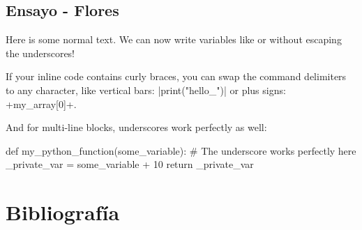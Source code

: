 \documentclass[11pt,letterpaper,spanish]{article}
\newcommand{\integranteCuatro}{Flores}
\begin{document}
\subsection*{Ensayo - \integranteCuatro}





Here is some normal text. We can now write variables like  or  without escaping the underscores!

If your inline code contains curly braces, you can swap the command delimiters to any character, like vertical bars: \code|print("hello_{}")| or plus signs: \code+my_array[0]+.

And for multi-line blocks, underscores work perfectly as well:

\begin{codeblock}
	def my_python_function(some_variable):
	# The underscore works perfectly here
	_private_var = some_variable + 10
	return _private_var
\end{codeblock}


\section*{Bibliografía}
\printbibliography
\end{document}
